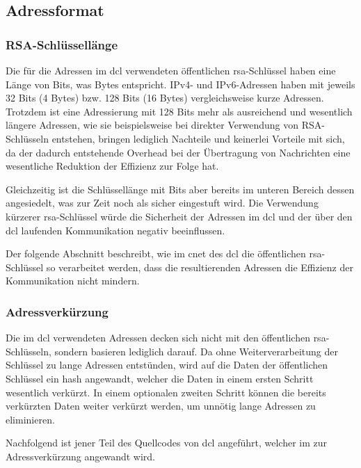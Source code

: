 \subsection{Adressformat}
\label{dcl-addr-format}

\subsubsection{RSA-Schlüssellänge}
Die für die Adressen im \gls{dcl} verwendeten öffentlichen \gls{rsa}-Schlüssel haben eine Länge von \addrkeybits
Bits, was \addrkeybytes Bytes entspricht.
IPv4- und IPv6-Adressen haben mit jeweils 32 Bits (4 Bytes) bzw. 128 Bits (16 Bytes) vergleichsweise kurze
Adressen. Trotzdem ist eine Adressierung mit 128 Bits mehr als ausreichend und wesentlich längere
Adressen, wie sie beispielsweise bei direkter Verwendung von RSA-Schlüsseln entstehen, bringen
lediglich Nachteile und keinerlei Vorteile mit sich, da der dadurch entstehende
Overhead bei der Übertragung von Nachrichten eine wesentliche Reduktion der
Effizienz zur Folge hat.

Gleichzeitig ist die Schlüssellänge mit \addrkeybits Bits aber bereits im
unteren Bereich dessen angesiedelt, was zur Zeit noch als sicher eingestuft
wird. \cite{keylength:bsi}
Die Verwendung kürzerer \gls{rsa}-Schlüssel würde die Sicherheit der Adressen
im \gls{dcl} und der über den \gls{dcl} laufenden Kommunikation negativ
beeinflussen.

Der folgende Abschnitt beschreibt, wie im \gls{cnet} des \gls{dcl} die
öffentlichen \gls{rsa}-Schlüssel so verarbeitet werden, dass die resultierenden
Adressen die Effizienz der Kommunikation nicht mindern.

\subsubsection{Adressverkürzung}
\label{dcl-addr-scaling}
Die im \gls{dcl} verwendeten Adressen decken sich nicht mit den öffentlichen \gls{rsa}-Schlüsseln,
sondern basieren lediglich darauf. Da ohne Weiterverarbeitung der Schlüssel zu lange Adressen entstünden,
wird auf die Daten der öffentlichen Schlüssel ein \gls{hash} angewandt, welcher die Daten in einem ersten
Schritt wesentlich verkürzt. In einem optionalen zweiten Schritt können die bereits verkürzten
Daten weiter verkürzt werden, um unnötig lange Adressen zu eliminieren.

Nachfolgend ist jener Teil des Quellcodes von \gls{dcl} angeführt, welcher im 
zur Adressverkürzung angewandt wird.

